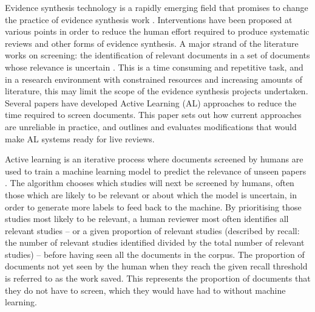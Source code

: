 \documentclass{bmcart}
\begin{document}
	Evidence synthesis technology is a rapidly emerging field that promises to change the practice of evidence synthesis work \cite{Westgate2018}.
	Interventions have been proposed at various points in order to reduce the human effort required to produce systematic reviews and other forms of evidence synthesis.
	A major strand of the literature works on screening: the identification of relevant documents in a set of documents whose relevance is uncertain \cite{OMara-Eves2015}. 
	This is a time consuming and repetitive task, and in a research environment with constrained resources and increasing amounts of literature, this may limit the scope of the evidence synthesis projects undertaken.
	Several papers have developed Active Learning (AL) approaches \cite{miwa2014, Wallace2010a, Wallace2010, Jonnalagadda2013, Przybya2018} to reduce the time required to screen documents. This paper sets out how current approaches are  unreliable in practice, and outlines and evaluates modifications that would make AL systems ready for live reviews.
	
	Active learning is an iterative process where documents screened by humans are used to train a machine learning model to predict the relevance of unseen papers \cite{Settles2009}.
	The algorithm chooses which studies will next be screened by humans, often those which are likely to be relevant or about which the model is uncertain, in order to generate more labels to feed back to the machine. 
	By prioritising those studies most likely to be relevant, a human reviewer most often identifies all relevant studies -- or a given proportion of relevant studies (described by recall: the number of relevant studies identified divided by the total number of relevant studies) -- before having seen all the documents in the corpus. 
	The proportion of documents not yet seen by the human when they reach the given recall threshold is referred to as the work saved. This represents the proportion of documents that they do not have to screen, which they would have had to without machine learning.
	
\end{document}
